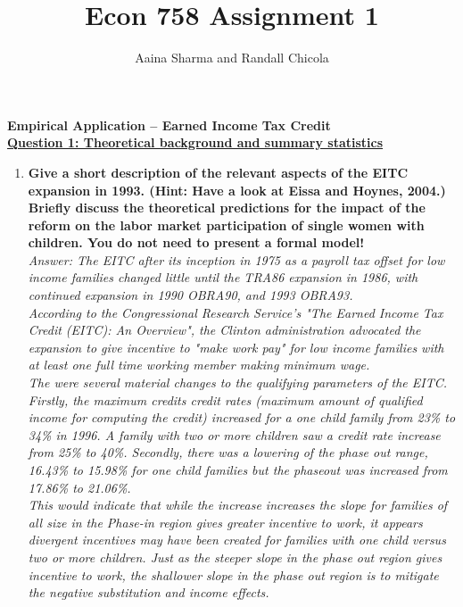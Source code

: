 \documentclass{article}
\begin{document}
	
	
\title{Econ 758 Assignment 1}
\author{Aaina Sharma and Randall Chicola}
\maketitle
\textbf{Empirical Application – Earned Income Tax Credit
} \\

\textbf{\underline{Question 1: Theoretical background and summary statistics}}

\begin{enumerate}
	
\item \textbf{Give a short description of the relevant aspects of the EITC expansion in 1993. (Hint: Have a look at Eissa and Hoynes, 2004.) Briefly discuss the theoretical predictions for the impact of the reform on the labor market participation of single women with children. You do not need to present a formal model!}\\

\textit{Answer: The EITC after its inception in 1975 as a payroll tax offset for low income families changed little until the TRA86 expansion in 1986, with continued expansion in 1990 OBRA90, and 1993 OBRA93.} \\

\textit{According to the Congressional Research Service's "The Earned Income Tax Credit (EITC): An Overview", the Clinton administration advocated the expansion to give incentive to "make work pay" for low income families with at least one full time working member making minimum wage.}\\

\textit{The were several material changes to the qualifying parameters of the EITC. Firstly, the maximum credits credit rates (maximum amount of qualified income for computing the credit) increased for a one child family from 23\% to 34\% in 1996. A family with two or more children saw a credit rate increase from 25\% to 40\%. Secondly, there was a lowering of the phase out range, 16.43\% to 15.98\% for one child families but the phaseout was increased from 17.86\% to 21.06\%.}\\

\textit{This would indicate that while the increase increases the slope for families of all size in the Phase-in region gives greater incentive to work, it appears divergent incentives may have been created for families with one child versus two or more children. Just as the steeper slope in the phase out region gives incentive to work, the shallower slope in the phase out region is to mitigate the negative substitution and income effects.} \\


\end{enumerate}
\end{document}
